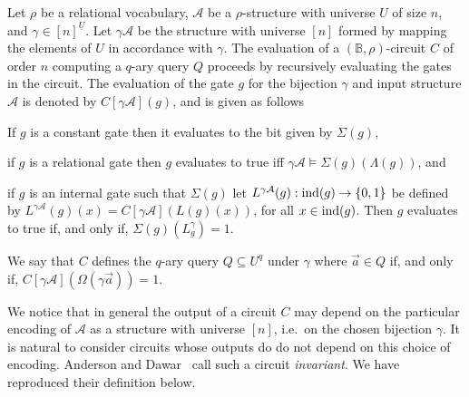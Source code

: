 \documentclass[../paper.tex]{subfiles}
\begin{document}

Let $\rho$ be a relational vocabulary, $\mathcal{A}$ be a $\rho$-structure with
universe $U$ of size $n$, and $\gamma \in [n]^{\underline{U}}$. Let $\gamma
\mathcal{A}$ be the structure with universe $[n]$ formed by mapping the elements
of $U$ in accordance with $\gamma$. The evaluation of a $(\mathbb{B},
\rho)$-circuit $C$ of order $n$ computing a $q$-ary query $Q$ proceeds by
recursively evaluating the gates in the circuit. The evaluation of the gate $g$
for the bijection $\gamma$ and input structure $\mathcal{A}$ is denoted by
$C[\gamma \mathcal{A}](g)$, and is given as follows

\begin{myenum}
\item If $g$ is a constant gate then it evaluates to the bit given by
  $\Sigma(g)$,
\item if $g$ is a relational gate then $g$ evaluates to true iff $\gamma
  \mathcal{A} \models \Sigma(g)(\Lambda (g))$, and
\item if $g$ is an internal gate such that $\Sigma (g)$ let $L^{\gamma
    \mathcal{A}}(g): \text{\upshape ind}(g) \rightarrow \{0,1\}$ be defined by
  $L^{\gamma\mathcal{A}}(g)(x) = C[\gamma \mathcal{A}](L(g)(x))$, for all $x \in
  \text{\upshape ind}(g)$. Then $g$ evaluates to true if, and only if, $\Sigma(g)
  (L^{\gamma}_g) = 1$.
\end{myenum}
We say that $C$ defines the $q$-ary query $Q \subseteq U^q$ under $\gamma$ where
$\vec{a} \in Q$ if, and only if, $C[\gamma \mathcal{A}](\Omega (\gamma \vec{a}))
= 1$.


We notice that in general the output of a circuit $C$ may depend on the
particular encoding of $\mathcal{A}$ as a structure with universe $[n]$, i.e.\
on the chosen bijection $\gamma$. It is natural to consider circuits whose
outputs do do not depend on this choice of encoding. Anderson and
Dawar~\cite{AndersonD17} call such a circuit \emph{invariant}. We have
reproduced their definition below.
\end{document}
